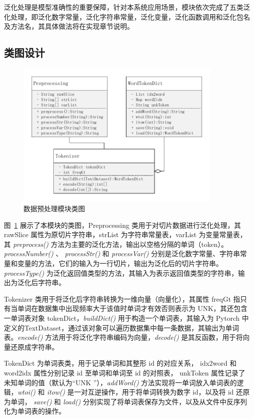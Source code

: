 泛化处理是模型准确性的重要保障，针对本系统应用场景，模块依次完成了五类泛化处理，即泛化数字常量，泛化字符串常量，泛化变量，泛化函数调用和泛化包名及方法名，其具体做法将在实现章节说明。

\subsection{类图设计}

\begin{figure}[!htb]
    \centering
    \includegraphics[width=0.9\textwidth]{FIGs/chapter3/preClass.pdf}
    \caption{数据预处理模块类图}\label{preClass}
\end{figure}

图~\ref{preClass} 展示了本模块的类图，Preprocessing 类用于对切片数据进行泛化处理，其 rawSlice 属性为原切片字符串，strList 为字符串常量表，varList 为变量常量表，其 \textit{preprocess()} 方法为主要的泛化方法，输出以空格分隔的单词（token）。\textit{processNumber()} 、 \textit{processStr()} 和 \textit{processVar()} 分别是泛化数字常量、字符串常量和变量的方法，它们的输入为一行切片，输出为泛化后的切片字符串。\textit{processType()} 为泛化返回值类型的方法，其输入为表示返回值类型的字符串，输出为泛化后字符串。

Tokenizer 类用于将泛化后字符串转换为一维向量（向量化），其属性 freqGt 指只有当单词在数据集中出现频率大于该值时单词才有效否则表示为 UNK，其还包含一单词表对象 tokenDict，\textit{buildDict()} 用于构造一个单词表，其输入为 Pytorch 中定义的TextDataset，通过该对象可以遍历数据集中每一条数据，其输出为单词表。\textit{encode()} 方法用于将泛化字符串编码为向量，\textit{decode()} 是其反函数，用于将向量还原成字符串。

TokenDict 为单词表类，用于记录单词和其整形 id 的对应关系， idx2word 和word2idx 属性分别记录 id 至单词和单词至 id 的对照表， unkToken 属性记录了未知单词的值（默认为“UNK ”），\textit{addWord()} 方法实现将一单词放入单词表的逻辑，\textit{wtoi()} 和 \textit{itow()} 是一对互逆操作，用于将单词转换为数字 id，以及将 id 还原为单词， \textit{save()} 和 \textit{load()} 分别实现了将单词表保存为文件，以及从文件中反序列化为单词表的操作。

